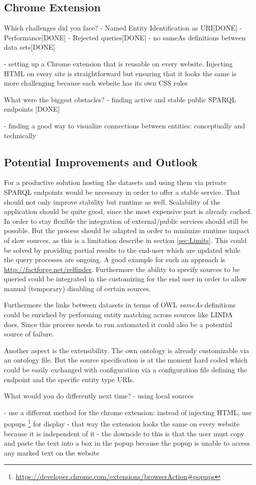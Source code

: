 \subsection{Chrome Extension}
Which challenges did you face?
- Named Entity Identification as URI[DONE]
- Performance[DONE]
- Rejected queries[DONE]
- no sameAs definitions between data sets[DONE]

- setting up a Chrome extension that is reusable on every website. Injecting HTML on every site is straightforward but ensuring that it looks the same is more challenging because each website has its own CSS rules


What were the biggest obstacles?
- finding active and stable public SPARQL endpoints [DONE]

- finding a good way to visualize connections between entities: conceptually and technically


\subsection{Potential Improvements and Outlook}
For a productive solution hosting the datasets and using them via private SPARQL endpoints would be necessary in order to offer a stable service. That should not only improve stability but runtime as well. Scalability of the application should be quite good, since the most expensive part is already cached. 
In order to stay flexible the integration of external/public services should still be possible. But the process should be adapted in order to minimize runtime impact of slow sources, as this is a limitation describe in section \ref{sec:Limits}. This could be solved by providing partial results to the end-user which are updated while the query processes are ongoing. A good example for such an approach is \url{http://factforge.net/relfinder}. Furthermore the ability to specify sources to be queried could be integrated in the customizing for the end user in order to allow manual (temporary) disabling of certain sources. 

Furthermore the links between datasets in terms of OWL \textit{sameAs} definitions could be enriched by performing entity matching across sources like LINDA~\cite{boehm_linda:_2012} does. Since this process needs to run automated it could also be a potential source of failure. 

Another aspect is the extensibility. The own ontology is already customizable via an ontology file. But the source specification is at the moment hard coded which could be easily exchanged with configuration via a configuration file defining the endpoint and the specific entity type URIs. 


What would you do differently next time?
- using local sources

- use a different method for the chrome extension: instead of injecting HTML, use popups \footnote{\url{https://developer.chrome.com/extensions/browserAction\#popups}} for display
- that way the extension looks the same on every website because it is independent of it
- the downside to this is that the user must copy and paste the text into a box in the popup because the popup is unable to access any marked text on the website

